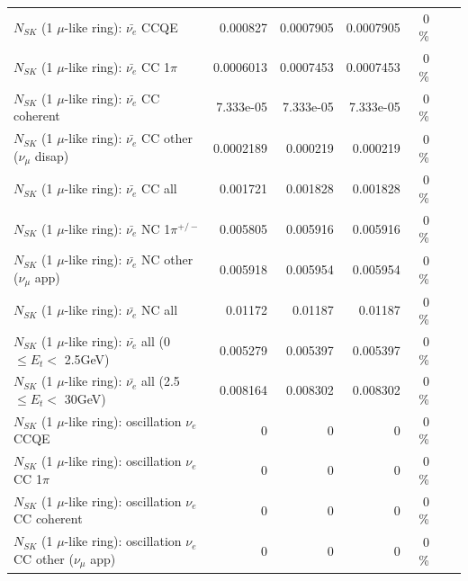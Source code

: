 \begin{table}
\begin{tabular}{| l | r | r | r  r | r  r |}
\hline
\hline
\hline
                                $N_{SK}$ (1 $\mu$-like ring): $\bar{\nu_e}$ CCQE &        0.000827 &      0.0007905 &      0.0007905 &       0 \%  & & \\
                           $N_{SK}$ (1 $\mu$-like ring): $\bar{\nu_e}$ CC 1$\pi$ &       0.0006013 &      0.0007453 &      0.0007453 &       0 \%  & & \\
                         $N_{SK}$ (1 $\mu$-like ring): $\bar{\nu_e}$ CC coherent &       7.333e-05 &      7.333e-05 &      7.333e-05 &       0 \%  & & \\
          $N_{SK}$ (1 $\mu$-like ring): $\bar{\nu_e}$ CC other ($\nu_\mu$ disap) &       0.0002189 &       0.000219 &       0.000219 &       0 \%  & & \\
                            $N_{SK}$ (1 $\mu$-like ring): $\bar{\nu_{e}}$ CC all &        0.001721 &       0.001828 &       0.001828 &       0 \%  & & \\
\hline
                     $N_{SK}$ (1 $\mu$-like ring): $\bar{\nu_e}$ NC 1$\pi^{+/-}$ &        0.005805 &       0.005916 &       0.005916 &       0 \%  & & \\
            $N_{SK}$ (1 $\mu$-like ring): $\bar{\nu_e}$ NC other ($\nu_\mu$ app) &        0.005918 &       0.005954 &       0.005954 &       0 \%  & & \\
                            $N_{SK}$ (1 $\mu$-like ring): $\bar{\nu_{e}}$ NC all &         0.01172 &        0.01187 &        0.01187 &       0 \%  & & \\
\hline
     $N_{SK}$ (1 $\mu$-like ring): $\bar{\nu_{e}}$ all (0 $\leq E_{t} <$ 2.5GeV) &        0.005279 &       0.005397 &       0.005397 &       0 \%  & & \\
    $N_{SK}$ (1 $\mu$-like ring): $\bar{\nu_{e}}$ all (2.5 $\leq E_{t} <$ 30GeV) &        0.008164 &       0.008302 &       0.008302 &       0 \%  & & \\
\hline
\hline
\hline
                          $N_{SK}$ (1 $\mu$-like ring): oscillation $\nu_e$ CCQE &               0 &              0 &              0 &       0 \%  & & \\
                     $N_{SK}$ (1 $\mu$-like ring): oscillation $\nu_e$ CC 1$\pi$ &               0 &              0 &              0 &       0 \%  & & \\
                   $N_{SK}$ (1 $\mu$-like ring): oscillation $\nu_e$ CC coherent &               0 &              0 &              0 &       0 \%  & & \\
      $N_{SK}$ (1 $\mu$-like ring): oscillation $\nu_e$ CC other ($\nu_\mu$ app) &               0 &              0 &              0 &       0 \%  & & \\

\end{tabular}
\end{table}
